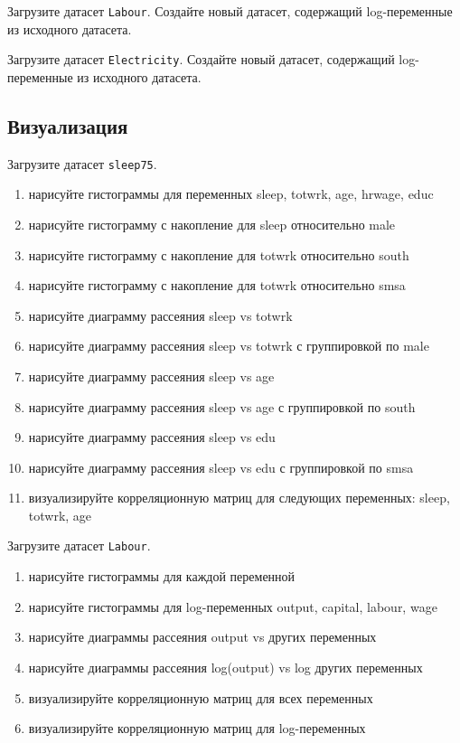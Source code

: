 \begin{exercise}
Загрузите датасет \texttt{Labour}. Создайте новый датасет, 
содержащий log-переменные из исходного датасета.
\end{exercise}

\begin{exercise}
Загрузите датасет \texttt{Electricity}. Создайте новый датасет, 
содержащий log-переменные из исходного датасета.
\end{exercise}

\subsection{Визуализация}

\begin{exercise}
Загрузите датасет \texttt{sleep75}.
\begin{enumerate}
	\item нарисуйте гистограммы для переменных sleep, totwrk, age, hrwage, educ
	\item нарисуйте гистограмму с накопление для sleep относительно male 
	\item нарисуйте гистограмму с накопление для totwrk относительно south 
	\item нарисуйте гистограмму с накопление для totwrk относительно smsa 
	\item нарисуйте диаграмму рассеяния sleep vs totwrk
	\item нарисуйте диаграмму рассеяния sleep vs totwrk с группировкой по male
	\item нарисуйте диаграмму рассеяния sleep vs age
	\item нарисуйте диаграмму рассеяния sleep vs age с группировкой по south
	\item нарисуйте диаграмму рассеяния sleep vs edu
	\item нарисуйте диаграмму рассеяния sleep vs edu с группировкой по smsa
	\item визуализируйте корреляционную матриц для следующих переменных: sleep, totwrk, age
\end{enumerate}
\end{exercise}

\begin{exercise}
Загрузите датасет \texttt{Labour}.
\begin{enumerate}
	\item нарисуйте гистограммы для каждой переменной
	\item нарисуйте гистограммы для log-переменных output, capital, labour, wage
	\item нарисуйте диаграммы рассеяния output vs других переменных
	\item нарисуйте диаграммы рассеяния log(output) vs log других переменных
	\item визуализируйте корреляционную матриц для всех переменных
	\item визуализируйте корреляционную матриц для log-переменных
\end{enumerate}
\end{exercise}

